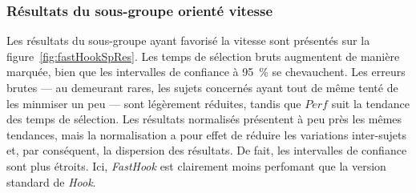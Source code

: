 	\subsubsection{Résultats du sous-groupe orienté vitesse}
	Les résultats du sous-groupe ayant favorisé la vitesse sont présentés sur la figure~\ref{fig:fastHookSpRes}. Les temps de sélection bruts augmentent de manière marquée, bien que les intervalles de confiance à 95~\%{} se chevauchent. Les erreurs brutes --- au demeurant rares, les sujets concernés ayant tout de même tenté de les minmiser un peu --- sont légèrement réduites, tandis que $Perf$ suit la tendance des temps de sélection. Les résultats normalisés présentent à peu près les mêmes tendances, mais la normalisation a pour effet de réduire les variations inter-sujets et, par conséquent, la dispersion des résultats. De fait, les intervalles de confiance sont plus étroits. Ici, \emph{FastHook} est clairement moins perfomant que la version standard de \emph{Hook}.

